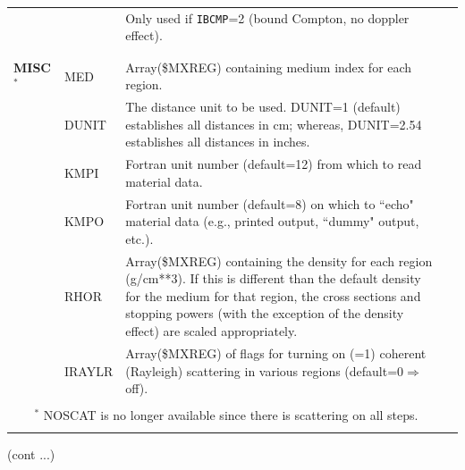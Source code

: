 \begin{table}[htb]
\begin{center}
\begin{tabular}{ l  l   p{105mm}l  |}
       && Only used if {\tt IBCMP}=2 (bound Compton, no doppler effect).\\
&&\\
\hline
&&\\
{\bfseries MISC$^*$}	& MED	&Array(\$MXREG) containing medium index for
                            each region.\\
	& DUNIT	&The distance unit to be used.
                            DUNIT=1 (default) establishes all
                            distances in cm; whereas,
                            DUNIT=2.54 establishes all
                            distances in inches.\\
	&KMPI	&Fortran unit number (default=12)
                            from which to read material data.\\
	&KMPO	&Fortran unit number (default=8) on
                            which to ``echo" material data (e.g.,
                            printed output, ``dummy" output, etc.).\\
	&RHOR	&Array(\$MXREG) containing the density for each region (g/cm**3).
		If this is different than the default density for the medium
		for that region, the cross sections and stopping powers (with
		the exception of the density effect) are scaled appropriately.\\
	&IRAYLR	&Array(\$MXREG) of flags for turning on (=1)
                            coherent (Rayleigh) scattering in
                            various regions (default=0$\Rightarrow$ off).\\
&&\\
\hline
\multicolumn{3}{c}{$^*$ NOSCAT is no longer available since there is
scattering on all steps.}\\
&&\\
\hline
    \end{tabular}
    \end{center}
    \mbox{}\hfill (cont ...)\\
    \end{table}
    \clearpage



